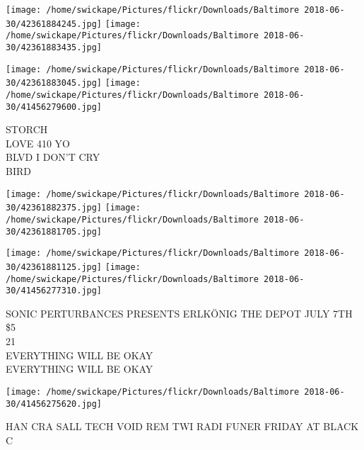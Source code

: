 \documentclass[10pt,letterpaper]{article}
\begin{document}
\texttt{[image: /home/swickape/Pictures/flickr/Downloads/Baltimore 2018-06-30/42361884245.jpg]}
\texttt{[image: /home/swickape/Pictures/flickr/Downloads/Baltimore 2018-06-30/42361883435.jpg]}

\texttt{[image: /home/swickape/Pictures/flickr/Downloads/Baltimore 2018-06-30/42361883045.jpg]}
\texttt{[image: /home/swickape/Pictures/flickr/Downloads/Baltimore 2018-06-30/41456279600.jpg]}

STORCH\\
LOVE 410 YO\\
BLVD I DON'T CRY\\
BIRD
\pagebreak

\texttt{[image: /home/swickape/Pictures/flickr/Downloads/Baltimore 2018-06-30/42361882375.jpg]}
\texttt{[image: /home/swickape/Pictures/flickr/Downloads/Baltimore 2018-06-30/42361881705.jpg]}

\texttt{[image: /home/swickape/Pictures/flickr/Downloads/Baltimore 2018-06-30/42361881125.jpg]}
\texttt{[image: /home/swickape/Pictures/flickr/Downloads/Baltimore 2018-06-30/41456277310.jpg]}

SONIC PERTURBANCES PRESENTS ERLKÖNIG THE DEPOT JULY 7TH \$5\\
21\\
EVERYTHING WILL BE OKAY\\
EVERYTHING WILL BE OKAY
\pagebreak

\texttt{[image: /home/swickape/Pictures/flickr/Downloads/Baltimore 2018-06-30/41456275620.jpg]}

HAN CRA SALL TECH VOID REM TWI RADI FUNER FRIDAY AT BLACK C
\pagebreak
\end{document}
